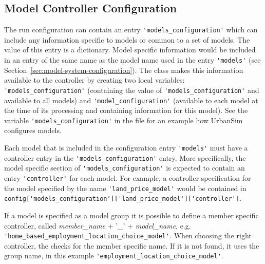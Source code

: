 \subsection{Model Controller Configuration}
\label{sec:models-configuration}
\label{sec:model-controller-configuration}
%
The run configuration can contain an entry \verb|'models_configuration'| \modelsindex which can
include any information specific to models \modelsindex or common to a set of models. \modelsindex The
value of this entry is a dictionary.  Model specific information would be
included in an entry of the same name as the model name used in the entry
\verb|'models'| (see Section~\ref{sec:model-system-configuration}). The
 \modelsindex class makes this information available to the controller
by creating two local variables: \verb|'models_configuration'| \modelsindex (containing the
value of \verb|'models_configuration'| \modelsindex and available to all models) \modelsindex and
\verb|'model_configuration'| \modelsindex (available to each model at the time of its
processing and containing information for this model). See the variable
\verb|'models_configuration'| \modelsindex in the file  for an
example how UrbanSim configures models. \modelsindex

Each model that is included in the configuration entry \verb|'models'| \modelsindex must have a
controller entry in the \verb|'models_configuration'| \modelsindex entry.  More specifically, the model specific
section of \verb|'models_configuration'| \modelsindex is expected to contain an entry \verb|'controller'|
for each model. For example, a controller specification for the model
specified by the name \verb|'land_price_model'| would be contained in\\
\verb|config['models_configuration']['land_price_model']['controller']|.

If a model is specified as a model group  it is possible to define a member specific controller, called 
{\em member_name} + '_' + {\em model_name}, e.g. \verb|'home_based_employment_location_choice_model'|.
When choosing the right controller, the  checks for the member specific name. If it is not found,
it uses the group name, in this example \verb|'employment_location_choice_model'|.

